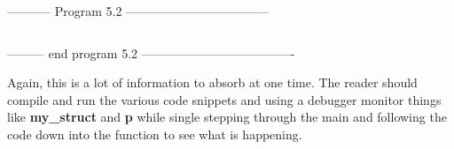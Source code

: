 -----------  Program 5.2  -----------------------------------
\inputminted[breaklines]{c}{../src/ch5-2.c}
--------- end program 5.2 -------------------------------------

Again, this is a lot of information to absorb at one time. The reader
should compile and run the various code snippets and using a debugger
monitor things like \textbf{my\_struct} and \textbf{p} while single
stepping through the main and following the code down into the function
to see what is happening.\\

\begin{comment}
\href{ch6x.htm}{Chapter 6: More on Strings and Arrays of Strings}

\href{pointers.htm}{Back to Table of Contents}
\end{comment}
